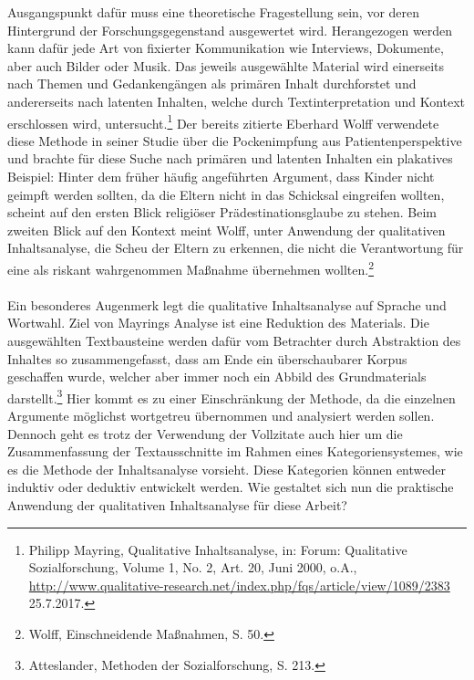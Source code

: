 \documentclass[
    a4paper,
    12pt,
    hyphens,
    chapterprefix=true,
    headheight=33pt,
    footheight=29pt,
    headings=optiontohead,
]{scrartcl}
\begin{document}
Ausgangspunkt dafür muss eine theoretische Fragestellung sein, vor deren Hintergrund der Forschungsgegenstand ausgewertet wird. Herangezogen werden kann dafür jede Art von fixierter Kommunikation wie Interviews, Dokumente, aber auch Bilder oder Musik. Das jeweils ausgewählte Material wird einerseits nach Themen und Gedankengängen als primären Inhalt durchforstet und andererseits nach latenten Inhalten, welche durch Textinterpretation und Kontext erschlossen wird, untersucht.\footnote{Philipp Mayring, Qualitative Inhaltsanalyse, in: Forum: Qualitative Sozialforschung, Volume 1, No. 2, Art. 20, Juni 2000, o.A., \url{http://www.qualitative-research.net/index.php/fqs/article/view/1089/2383} 25.7.2017.} Der bereits zitierte Eberhard Wolff verwendete diese Methode in seiner Studie über die Pockenimpfung aus Patientenperspektive und brachte für diese Suche nach primären und latenten Inhalten ein plakatives Beispiel: Hinter dem früher häufig angeführten Argument, dass Kinder nicht geimpft werden sollten, da die Eltern nicht in das Schicksal eingreifen wollten, scheint auf den ersten Blick religiöser Prädestinationsglaube zu stehen. Beim zweiten Blick auf den Kontext meint Wolff, unter Anwendung der qualitativen Inhaltsanalyse, die Scheu der Eltern zu erkennen, die nicht die Verantwortung für eine als riskant wahrgenommen Maßnahme übernehmen wollten.\footnote{Wolff, Einschneidende Maßnahmen, S. 50.}\\
\\
Ein besonderes Augenmerk legt die qualitative Inhaltsanalyse auf Sprache und Wortwahl. Ziel von Mayrings Analyse ist eine Reduktion des Materials. Die ausgewählten Textbausteine werden dafür vom Betrachter durch Abstraktion des Inhaltes so zusammengefasst, dass am Ende ein überschaubarer Korpus geschaffen wurde, welcher aber immer noch ein Abbild des Grundmaterials darstellt.\footnote{Atteslander, Methoden der Sozialforschung, S. 213.} Hier kommt es zu einer Einschränkung der Methode, da die einzelnen Argumente möglichst wortgetreu übernommen und analysiert werden sollen. Dennoch geht es trotz der Verwendung der Vollzitate auch hier um die Zusammenfassung der Textausschnitte im Rahmen eines Kategoriensystemes, wie es die Methode der Inhaltsanalyse vorsieht. Diese Kategorien können entweder induktiv oder deduktiv entwickelt werden. Wie gestaltet sich nun die praktische Anwendung der qualitativen Inhaltsanalyse für diese Arbeit?
\end{document}

